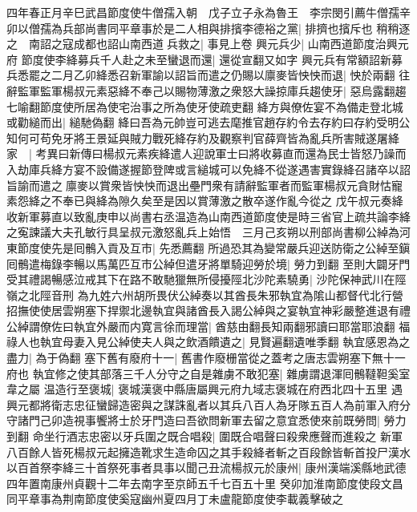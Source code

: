 四年春正月辛巳武昌節度使牛僧孺入朝　戊子立子永為魯王　李宗閔引薦牛僧孺辛卯以僧孺為兵部尚書同平章事於是二人相與排擯李德裕之黨|{
	排擠也擯斥也}
稍稍逐之　南詔之寇成都也詔山南西道兵救之|{
	事見上卷}
興元兵少|{
	山南西道節度治興元府}
節度使李絳募兵千人赴之未至蠻退而還|{
	還從宣翻又如字}
興元兵有常額詔新募兵悉罷之二月乙卯絳悉召新軍諭以詔旨而遣之仍賜以廪麥皆怏怏而退|{
	怏於兩翻}
往辭監軍監軍楊叔元素惡絳不奉己以賜物薄激之衆怒大譟掠庫兵趨使牙|{
	惡烏露翻趨七喻翻節度使所居為使宅治事之所為使牙使疏吏翻}
絳方與僚佐宴不為備走登北城或勸縋而出|{
	縋馳偽翻}
絳曰吾為元帥豈可逃去麾推官趙存約令去存約曰存約受明公知何可苟免牙將王景延與賊力戰死絳存約及觀察判官薛齊皆為亂兵所害賊遂屠絳家　|{
	考異曰新傳曰楊叔元素疾絳遣人迎說軍士曰將收募直而還為民士皆怒乃譟而入劫庫兵絳方宴不設備遂握節登陴或言縋城可以免絳不從遂遇害實錄絳召諸卒以詔旨諭而遣之廪麥以賞衆皆怏怏而退出壘門衆有請辭監軍者而監軍楊叔元貪財怙寵素怨絳之不奉已與絳為隙久矣至是因以賞薄激之散卒遂作亂今從之}
戊午叔元奏絳收新軍募直以致亂庚申以尚書右丞温造為山南西道節度使是時三省官上疏共論李絳之寃諫議大夫孔敏行具呈叔元激怒亂兵上始悟　三月己亥朔以刑部尚書柳公綽為河東節度使先是囘鶻入貢及互市|{
	先悉薦翻}
所過恐其為變常嚴兵迎送防衛之公綽至鎭囘鶻遣梅錄李暢以馬萬匹互市公綽但遣牙將單騎迎勞於境|{
	勞力到翻}
至則大闢牙門受其禮謁暢感泣戒其下在路不敢馳獵無所侵擾陘北沙陀素驍勇|{
	沙陀保神武川在陘嶺之北陘音刑}
為九姓六州胡所畏伏公綽奏以其酋長朱邪執宜為隂山都督代北行營招撫使使居雲朔塞下捍禦北邊執宜與諸酋長入謁公綽與之宴執宜神彩嚴整進退有禮公綽謂僚佐曰執宜外嚴而内寛言徐而理當|{
	酋慈由翻長知兩翻邪讀曰耶當耶浪翻}
福祿人也執宜母妻入見公綽使夫人與之飲酒饋遺之|{
	見賢遍翻遺唯季翻}
執宜感恩為之盡力|{
	為于偽翻}
塞下舊有廢府十一|{
	舊書作廢栅當從之蓋考之唐志雲朔塞下無十一府也}
執宜修之使其部落三千人分守之自是雜虜不敢犯塞|{
	雜虜謂退渾囘鶻韃靼奚室韋之屬}
温造行至褒城|{
	褒城漢褒中縣唐屬興元府九域志褒城在府西北四十五里}
遇興元都將衛志忠征蠻歸造密與之謀誅亂者以其兵八百人為牙隊五百人為前軍入府分守諸門己卯造視事饗將士於牙門造曰吾欲問新軍去留之意宜悉使來前既勞問|{
	勞力到翻}
命坐行酒志忠密以牙兵圍之既合唱殺|{
	圍既合唱聲曰殺衆應聲而進殺之}
新軍八百餘人皆死楊叔元起擁造靴求生造命囚之其手殺絳者斬之百段餘皆斬首投尸漢水以百首祭李絳三十首祭死事者具事以聞己丑流楊叔元於康州|{
	康州漢端溪縣地武德四年置南康州貞觀十二年去南字至京師五千七百五十里}
癸卯加淮南節度使段文昌同平章事為荆南節度使奚寇幽州夏四月丁未盧龍節度使李載義擊破之

